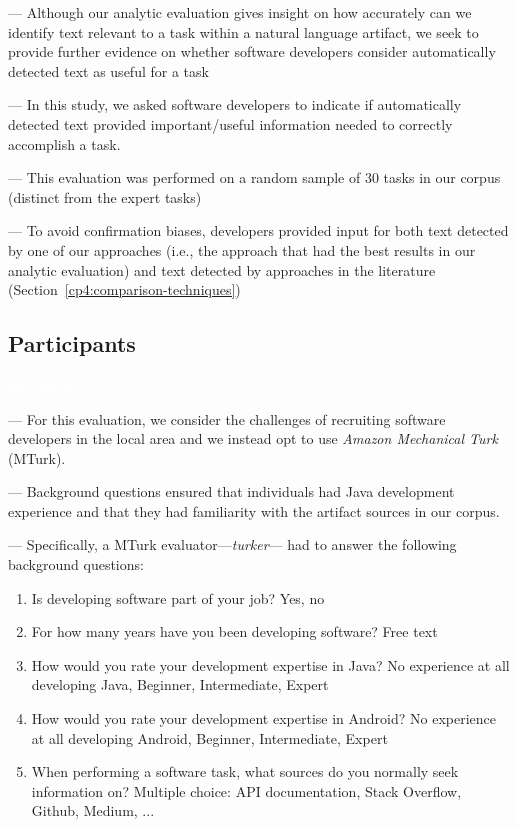

--- Although our analytic evaluation gives insight on how accurately can we identify text relevant to a task within a natural language artifact, we seek to provide further evidence on whether software developers consider automatically detected text as useful for a task 

--- In this study, we asked software developers to indicate if automatically detected text provided important/useful information needed to correctly accomplish a task.

--- This evaluation was performed on a random sample of 30 tasks in our corpus (distinct from the expert tasks)

--- To avoid confirmation biases, developers provided input for both text detected by one of our approaches (i.e., the approach that had the best results in our analytic evaluation) and text detected by approaches in the literature (Section~\ref{cp4:comparison-techniques})



\subsection{Participants}
\textcolor{white}{force ident} %

--- For this evaluation, we consider the challenges of recruiting software developers in the local area and we instead opt to use 
\textit{Amazon Mechanical Turk}~\cite{mturk} (MTurk).

--- Background questions ensured that individuals had Java development experience and that they had familiarity with the artifact sources in our corpus.

--- Specifically, a MTurk evaluator---\textit{turker}--- had to answer the following background questions:


\begin{enumerate}[leftmargin=\parindent, font=\normalfont\itshape, label=BQ\textsubscript{\arabic*.}]
    \item Is developing software part of your job? Yes, no 
    \item For how many years have you been developing software? Free text
    \item How would you rate your development expertise in Java? No experience at all developing Java, Beginner, Intermediate, Expert
    \item How would you rate your development expertise in Android? No experience at all developing Android, Beginner, Intermediate, Expert
    \item When performing a software task, what sources do you normally seek information on? Multiple choice: API documentation, Stack Overflow, Github, Medium, ...
\end{enumerate}

